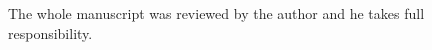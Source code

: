 The whole manuscript was reviewed by the author and he takes full responsibility.

\cleardoublepage

